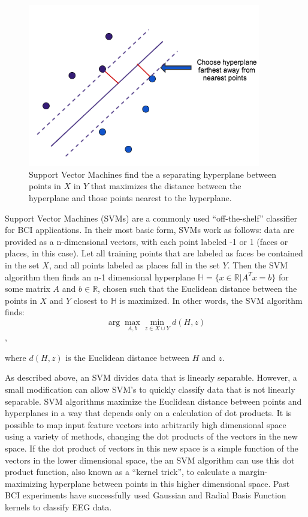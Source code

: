 \documentclass[11pt]{report}
\newcommand{\argmax}{\arg\!\max}
\begin{document}
\begin{figure}[t]
\centering
\includegraphics[width=4in]{svm}
\caption{Support Vector Machines find the a separating hyperplane between points in $X$ in $Y$ that maximizes the distance between the hyperplane and those points nearest to the hyperplane.}
\end{figure}

	Support Vector Machines (SVMs) are a commonly used ``off-the-shelf'' classifier for BCI applications.  In their most basic form, SVMs work as follows:  data are provided as a n-dimensional vectors, with each point labeled -1 or 1 (faces or places, in this case).  Let all training points that are labeled as faces be contained in the set $X$, and all points labeled as places fall in the set $Y$.  Then the SVM algorithm then finds an n-1 dimensional hyperplane $\mathbb{H} = \{x\in \mathbb{R}| A^Tx=b\}$ for some matrix $A$ and $b\in \mathbb{R}$, chosen such that the Euclidean distance between the points in $X$ and $Y$ closest to $\mathbb{H}$ is maximized.  In other words, the SVM algorithm finds:
		$$ \argmax_{A,b} \min_{z\in X\cup Y} d(H,z) $$,
		
		where $d(H,z)$ is the Euclidean distance between $H$ and $z$.
		
	As described above, an SVM divides data that is linearly separable.  However, a small modification can allow SVM's to quickly classify data that is not linearly separable.  SVM algorithms maximize the Euclidean distance between points and hyperplanes in a way that depends only on a calculation of dot products.  It is possible to map input feature vectors into arbitrarily high dimensional space using a variety of methods, changing the dot products of the vectors in the new space.  If the dot product of vectors in this new space is a simple function of the vectors in the lower dimensional space, the an SVM algorithm can use this dot product function, also known as a ``kernel trick'', to calculate a margin-maximizing hyperplane between points in this higher dimensional space.  Past BCI experiments have successfully used Gaussian and 	Radial Basis Function kernels to classify EEG data\cite{Lotte}.
\end{document}
